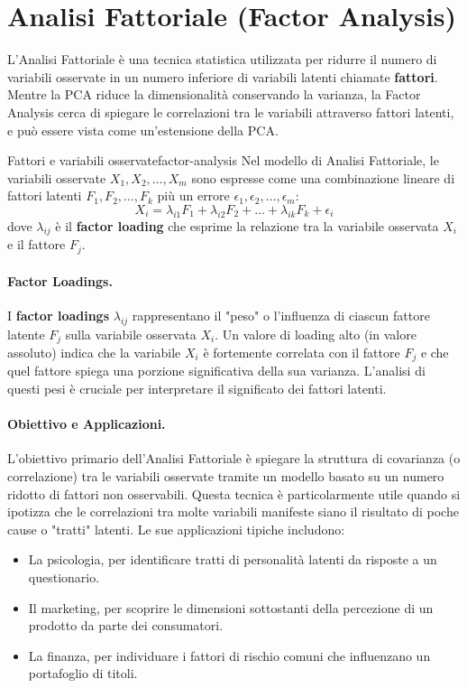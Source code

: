 \section{Analisi Fattoriale (Factor Analysis)}\label{sec:factor-analysis}

L'Analisi Fattoriale è una tecnica statistica utilizzata per ridurre il numero
di variabili osservate in un numero inferiore di variabili latenti chiamate
\textbf{fattori}. Mentre la PCA riduce la dimensionalità conservando la
varianza, la Factor Analysis cerca di spiegare le correlazioni tra le variabili
attraverso fattori latenti, e può essere vista come un'estensione della PCA.

\begin{definizione}{Fattori e variabili osservate}{factor-analysis}
Nel modello di Analisi Fattoriale, le variabili osservate \( X_1, X_2, \dots,
X_m \) sono espresse come una combinazione lineare di fattori latenti \( F_1,
F_2, \dots, F_k \) più un errore \( \epsilon_1, \epsilon_2, \dots, \epsilon_m
\):
\[
X_i = \lambda_{i1} F_1 + \lambda_{i2} F_2 + \dots + \lambda_{ik} F_k +
\epsilon_i
\]
dove \( \lambda_{ij} \) è il \textbf{factor loading} che esprime la relazione
tra la variabile osservata \( X_i \) e il fattore \( F_j \).
\end{definizione}

\paragraph{Factor Loadings.}
I \textbf{factor loadings} \( \lambda_{ij} \) rappresentano il "peso" o
l'influenza di ciascun fattore latente \( F_j \) sulla variabile osservata \(
X_i \). Un valore di loading alto (in valore assoluto) indica che la variabile
\(X_i\) è fortemente correlata con il fattore \(F_j\) e che quel fattore spiega
una porzione significativa della sua varianza. L'analisi di questi pesi è
cruciale per interpretare il significato dei fattori latenti.

\paragraph{Obiettivo e Applicazioni.}
L'obiettivo primario dell'Analisi Fattoriale è spiegare la struttura di
covarianza (o correlazione) tra le variabili osservate tramite un modello basato
su un numero ridotto di fattori non osservabili. Questa tecnica è
particolarmente utile quando si ipotizza che le correlazioni tra molte variabili
manifeste siano il risultato di poche cause o "tratti" latenti. Le sue
applicazioni tipiche includono:
\begin{itemize}
    \item La psicologia, per identificare tratti di personalità latenti da
    risposte a un questionario.
    \item Il marketing, per scoprire le dimensioni sottostanti della percezione
    di un prodotto da parte dei consumatori.
    \item La finanza, per individuare i fattori di rischio comuni che
    influenzano un portafoglio di titoli.
\end{itemize}

